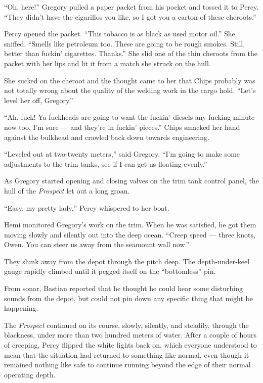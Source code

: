 \documentclass[
]{scrbook}
\begin{document}
``Oh, here!'' Gregory pulled a paper packet from his pocket and tossed
it to Percy. ``They didn't have the cigarillos you like, so I got you a
carton of these cheroots.''

Percy opened the packet. ``This tobacco is as black as used motor oil.''
She sniffed. ``Smells like petroleum too. These are going to be rough
smokes. Still, better than fuckin' cigarettes. Thanks.'' She slid one of
the thin cheroots from the packet with her lips and lit it from a match
she struck on the hull.

She sucked on the cheroot and the thought came to her that Chips
probably was not totally wrong about the quality of the welding work in
the cargo hold. ``Let's level her off, Gregory.''

``Ah, fuck! Ya fuckheads are going to want the fuckin' diesels any
fucking minute now too, I'm sure --- and they're in fuckin' pieces.''
Chips smacked her hand against the bulkhead and crawled back down
towards engineering.

``Leveled out at two-twenty meters,'' said Gregory. ``I'm going to make
some adjustments to the trim tanks, see if I can get us floating
evenly.''

As Gregory started opening and closing valves on the trim tank control
panel, the hull of the \emph{Prospect} let out a long groan.

``Easy, my pretty lady,'' Percy whispered to her boat.

Hemi monitored Gregory's work on the trim. When he was satisfied, he got
them moving slowly and silently out into the deep ocean. ``Creep speed
--- three knots, Owen. You can steer us away from the seamount wall
now.''

They slunk away from the depot through the pitch deep. The
depth-under-keel gauge rapidly climbed until it pegged itself on the
``bottomless'' pin.

From sonar, Bastian reported that he thought he could hear some
disturbing sounds from the depot, but could not pin down any specific
thing that might be happening.

\bigskip

The \emph{Prospect} continued on its course, slowly, silently, and
steadily, through the blackness, under more than two hundred meters of
water. After a couple of hours of creeping, Percy flipped the white
lights back on, which everyone understood to mean that the situation had
returned to something like normal, even though it remained nothing like
safe to continue running beyond the edge of their normal operating
depth.
\end{document}

